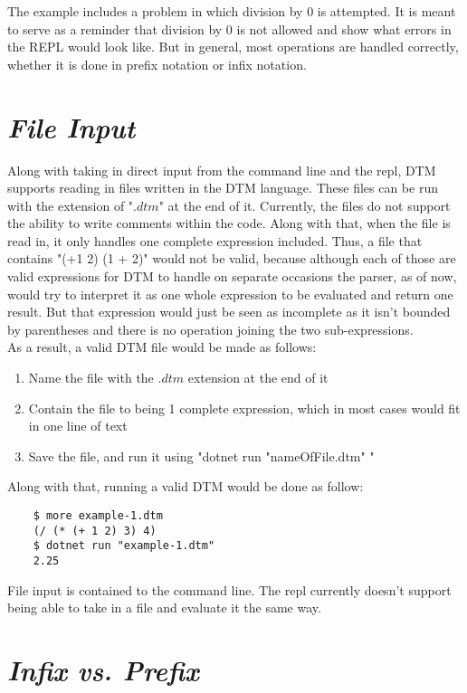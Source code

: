 \documentclass[10pt]{article}
\begin{document}
The example includes a problem in which division by 0 is attempted. It is meant to serve as a reminder that division by 0 is not allowed and show what errors in the REPL would look like. But in general, most operations are handled correctly, whether it is done in prefix notation or infix notation.

\section{\textit{File Input}}

Along with taking in direct input from the command line and the repl, DTM supports reading in files written in the DTM language. These files can be run with the extension of "$.dtm$" at the end of it. Currently, the files do not support the ability to write comments within the code. Along with that, when the file is read in, it only handles one complete expression included. Thus, a file that contains "(+1 2) (1 + 2)" would not be valid, because although each of those are valid expressions for DTM to handle on separate occasions the parser, as of now, would try to interpret it as one whole expression to be evaluated and return one result. But that expression would just be seen as incomplete as it isn't bounded by parentheses and there is no operation joining the two sub-expressions.\\

As a result, a valid DTM file would be made as follows:

\begin{enumerate}
    \item Name the file with the $.dtm$ extension at the end of it
    \item Contain the file to being 1 complete expression, which in most cases would fit in one line of text
    \item Save the file, and run it using "dotnet run "nameOfFile.dtm" "
\end{enumerate}

Along with that, running a valid DTM would be done as follow:

\begin{verbatim}
    $ more example-1.dtm 
    (/ (* (+ 1 2) 3) 4)
    $ dotnet run "example-1.dtm"
    2.25
\end{verbatim}

File input is contained to the command line. The repl currently doesn’t support being able to take in a file and evaluate it the same way.

\section{\textit{Infix vs. Prefix}}
\end{document}
